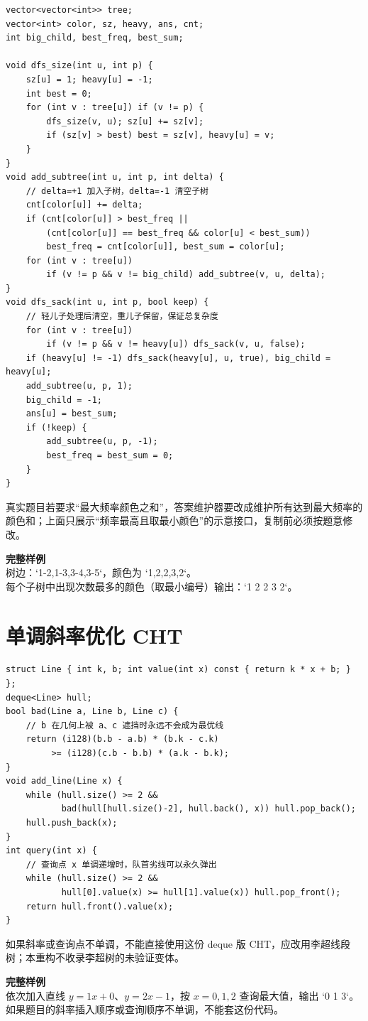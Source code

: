 \begin{lstlisting}[style=cpp]
vector<vector<int>> tree;
vector<int> color, sz, heavy, ans, cnt;
int big_child, best_freq, best_sum;

void dfs_size(int u, int p) {
    sz[u] = 1; heavy[u] = -1;
    int best = 0;
    for (int v : tree[u]) if (v != p) {
        dfs_size(v, u); sz[u] += sz[v];
        if (sz[v] > best) best = sz[v], heavy[u] = v;
    }
}
void add_subtree(int u, int p, int delta) {
    // delta=+1 加入子树，delta=-1 清空子树
    cnt[color[u]] += delta;
    if (cnt[color[u]] > best_freq ||
        (cnt[color[u]] == best_freq && color[u] < best_sum))
        best_freq = cnt[color[u]], best_sum = color[u];
    for (int v : tree[u])
        if (v != p && v != big_child) add_subtree(v, u, delta);
}
void dfs_sack(int u, int p, bool keep) {
    // 轻儿子处理后清空，重儿子保留，保证总复杂度
    for (int v : tree[u])
        if (v != p && v != heavy[u]) dfs_sack(v, u, false);
    if (heavy[u] != -1) dfs_sack(heavy[u], u, true), big_child = heavy[u];
    add_subtree(u, p, 1);
    big_child = -1;
    ans[u] = best_sum;
    if (!keep) {
        add_subtree(u, p, -1);
        best_freq = best_sum = 0;
    }
}
\end{lstlisting}

\begin{warnbox}
真实题目若要求“最大频率颜色之和”，答案维护器要改成维护所有达到最大频率的颜色和；上面只展示“频率最高且取最小颜色”的示意接口，复制前必须按题意修改。
\end{warnbox}

\begin{card}
\textbf{完整样例}\\
树边：`1-2,1-3,3-4,3-5`，颜色为 `1,2,2,3,2`。\\
每个子树中出现次数最多的颜色（取最小编号）输出：`1 2 2 3 2`。
\end{card}

\section{单调斜率优化 CHT}


\begin{lstlisting}[style=cpp]
struct Line { int k, b; int value(int x) const { return k * x + b; } };
deque<Line> hull;
bool bad(Line a, Line b, Line c) {
    // b 在几何上被 a、c 遮挡时永远不会成为最优线
    return (i128)(b.b - a.b) * (b.k - c.k)
         >= (i128)(c.b - b.b) * (a.k - b.k);
}
void add_line(Line x) {
    while (hull.size() >= 2 &&
           bad(hull[hull.size()-2], hull.back(), x)) hull.pop_back();
    hull.push_back(x);
}
int query(int x) {
    // 查询点 x 单调递增时，队首劣线可以永久弹出
    while (hull.size() >= 2 &&
           hull[0].value(x) >= hull[1].value(x)) hull.pop_front();
    return hull.front().value(x);
}
\end{lstlisting}

\begin{warnbox}
如果斜率或查询点不单调，不能直接使用这份 deque 版 CHT，应改用李超线段树；本重构不收录李超树的未验证变体。
\end{warnbox}

\begin{card}
\textbf{完整样例}\\
依次加入直线 \(y=1x+0\)、\(y=2x-1\)，按 \(x=0,1,2\) 查询最大值，输出 `0 1 3`。
如果题目的斜率插入顺序或查询顺序不单调，不能套这份代码。
\end{card}
